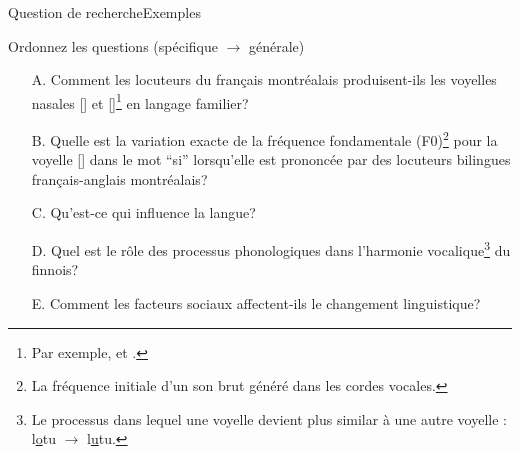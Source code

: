 \documentclass[xcolor=dvipsnames, onlymath, 10pt, aspectratio=169, handout]{beamer}
\begin{document}

\begin{frame}[t]{Question de recherche}{Exemples}

	\footnotesize

	\begin{importanttitle}{Ordonnez les questions (spécifique $\rightarrow$ générale)}


		\begin{enumerate}
			\item[A.] Comment les locuteurs du français montréalais produisent-ils les voyelles nasales [] et []\footnote{Par exemple,  et .} en langage familier?

			\item[B.] Quelle est la variation exacte de la fréquence fondamentale (F0)\footnote{La fréquence initiale d'un son brut généré dans les cordes vocales.} pour la voyelle [] dans le mot ``si'' lorsqu'elle est prononcée par des locuteurs bilingues français-anglais montréalais?

			\item[C.] Qu'est-ce qui influence la langue?

			\item[D.] Quel est le rôle des processus phonologiques dans l'harmonie vocalique\footnote{Le processus dans lequel une voyelle devient plus similar à une autre voyelle : l\underline{o}tu $\rightarrow$ l\underline{u}tu.} du finnois?

			\item[E.] Comment les facteurs sociaux affectent-ils le changement linguistique?
		\end{enumerate}
	\end{importanttitle}


\end{frame}
\end{document}
